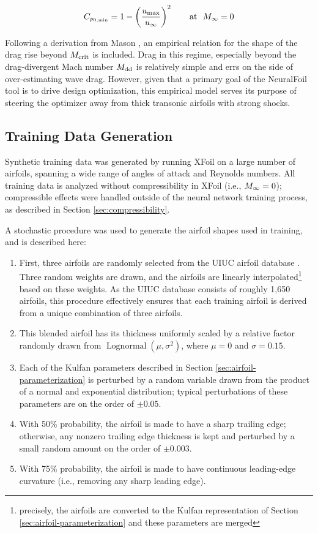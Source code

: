 \documentclass[conf]{new-aiaa}
\begin{document}
    \begin{equation}
        C_{p_{0,\rm min}} = 1 - \left( \frac{u_{\rm max}}{u_\infty} \right)^2 \qquad \text{at }\ M_\infty = 0
    \end{equation}

    Following a derivation from Mason \cite{mason_transonic_2006}, an empirical relation for the shape of the drag rise beyond $M_{\rm crit}$ is included. Drag in this regime, especially beyond the drag-divergent Mach number $M_{\rm dd}$ is relatively simple and errs on the side of over-estimating wave drag. However, given that a primary goal of the NeuralFoil tool is to drive design optimization, this empirical model serves its purpose of steering the optimizer away from thick transonic airfoils with strong shocks.

    \subsection{Training Data Generation}
    \label{sec:training-data}

    Synthetic training data was generated by running XFoil on a large number of airfoils, spanning a wide range of angles of attack and Reynolds numbers. All training data is analyzed without compressibility in XFoil (i.e., $M_\infty=0$); compressible effects were handled outside of the neural network training process, as described in Section \ref{sec:compressibility}.

    A stochastic procedure was used to generate the airfoil shapes used in training, and is described here:

    \begin{enumerate}
        \item First, three airfoils are randomly selected from the UIUC airfoil database \cite{uiuc_airfoil_database}. Three random weights are drawn, and the airfoils are linearly interpolated\footnote{precisely, the airfoils are converted to the Kulfan representation of Section \ref{sec:airfoil-parameterization} and these parameters are merged} based on these weights. As the UIUC database consists of roughly 1,650 airfoils, this procedure effectively ensures that each training airfoil is derived from a unique combination of three airfoils.
        \item This blended airfoil has its thickness uniformly scaled by a relative factor randomly drawn from $\operatorname{Lognormal}(\mu, \sigma^2)$, where $\mu=0$ and $\sigma=0.15$.
        \item Each of the Kulfan parameters described in Section \ref{sec:airfoil-parameterization} is perturbed by a random variable drawn from the product of a normal and exponential distribution; typical perturbations of these parameters are on the order of $\pm 0.05$.
        \item With 50\% probability, the airfoil is made to have a sharp trailing edge; otherwise, any nonzero trailing edge thickness is kept and perturbed by a small random amount on the order of $\pm 0.003$.
        \item With 75\% probability, the airfoil is made to have continuous leading-edge curvature (i.e., removing any sharp leading edge).
    \end{enumerate}
\end{document}
